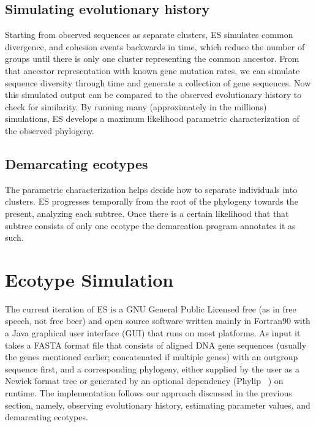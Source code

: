 \subsection*{Simulating evolutionary history}
Starting from observed sequences as separate clusters, ES simulates common divergence, and cohesion events backwards in time, which reduce the number of groups until there is only one cluster representing the common ancestor.
From that ancestor representation with known gene mutation rates, we can simulate sequence diversity through time and generate a collection of gene sequences.
Now this simulated output can be compared to the observed evolutionary history to check for similarity.
By running many (approximately in the millions) simulations, ES develops a maximum likelihood parametric characterization of the observed phylogeny. 

\subsection*{Demarcating ecotypes}
The parametric characterization helps decide how to separate individuals into clusters.
ES progresses temporally from the root of the phylogeny towards the present, analyzing each subtree.
Once there is a certain likelihood that that subtree consists of only one ecotype the demarcation program annotates it as such.


\section{Ecotype Simulation}
%
%
The current iteration of ES is a GNU General Public Licensed free (as in free speech, not free beer) and open source software written mainly in Fortran90 with a Java graphical user interface (GUI) that runs on most platforms.
As input it takes a FASTA format file that consists of aligned DNA gene sequences (usually the genes mentioned earlier; concatenated if multiple genes) with an outgroup sequence first, and a corresponding phylogeny, either supplied by the user as a Newick format tree or generated by an optional dependency (Phylip ~\cite{felsenstein1989phylip}) on runtime.
The implementation follows our approach discussed in the previous section, namely, observing evolutionary history, estimating parameter values, and demarcating ecotypes.

